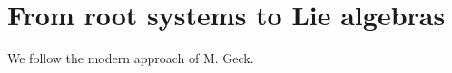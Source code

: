 \section{From root systems to Lie algebras}
\label{sec:root-systems-to-lie-algebras}
We follow the modern approach of M. Geck.